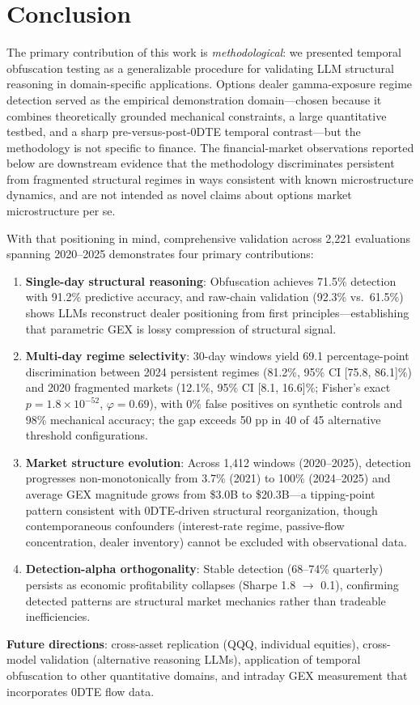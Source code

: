 \section{Conclusion}
\label{sec:conclusion}

The primary contribution of this work is \textit{methodological}: we
presented temporal obfuscation testing as a generalizable procedure
for validating LLM structural reasoning in domain-specific applications.
Options dealer gamma-exposure regime detection served as the empirical
demonstration domain---chosen because it combines theoretically
grounded mechanical constraints, a large quantitative testbed, and a
sharp pre-versus-post-0DTE temporal contrast---but the methodology is
not specific to finance. The financial-market observations reported
below are downstream evidence that the methodology discriminates
persistent from fragmented structural regimes in ways consistent with
known microstructure dynamics, and are not intended as novel claims
about options market microstructure per se.

With that positioning in mind, comprehensive validation across 2,221
evaluations spanning 2020--2025 demonstrates four primary contributions:

\begin{enumerate}
\item \textbf{Single-day structural reasoning}: Obfuscation achieves 71.5\% detection with 91.2\% predictive accuracy, and raw-chain validation (92.3\% vs.\ 61.5\%) shows LLMs reconstruct dealer positioning from first principles---establishing that parametric GEX is lossy compression of structural signal.

\item \textbf{Multi-day regime selectivity}: 30-day windows yield 69.1 percentage-point discrimination between 2024 persistent regimes (81.2\%, 95\% CI [75.8, 86.1]\%) and 2020 fragmented markets (12.1\%, 95\% CI [8.1, 16.6]\%; Fisher's exact $p = 1.8 \times 10^{-52}$, $\varphi = 0.69$), with 0\% false positives on synthetic controls and 98\% mechanical accuracy; the gap exceeds 50 pp in 40 of 45 alternative threshold configurations.

\item \textbf{Market structure evolution}: Across 1{,}412 windows (2020--2025), detection progresses non-monotonically from 3.7\% (2021) to 100\% (2024--2025) and average GEX magnitude grows from \$3.0B to \$20.3B---a tipping-point pattern consistent with 0DTE-driven structural reorganization, though contemporaneous confounders (interest-rate regime, passive-flow concentration, dealer inventory) cannot be excluded with observational data.

\item \textbf{Detection-alpha orthogonality}: Stable detection (68--74\% quarterly) persists as economic profitability collapses (Sharpe 1.8 $\rightarrow$ 0.1), confirming detected patterns are structural market mechanics rather than tradeable inefficiencies.
\end{enumerate}

\noindent\textbf{Future directions}: cross-asset replication (QQQ, individual equities), cross-model validation (alternative reasoning LLMs), application of temporal obfuscation to other quantitative domains, and intraday GEX measurement that incorporates 0DTE flow data.
